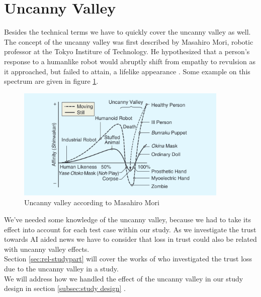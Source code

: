 \documentclass[
  a4paper,  %
  twoside,  %
  bibliography=totoc,
  headsepline,
  cleardoublepage=empty,
  parskip=half,
  draft=false
]{scrbook}
\begin{document}
\section{Uncanny Valley}
Besides the technical terms we have to quickly cover the uncanny valley as well. The concept of the uncanny valley was first described by Masahiro Mori, robotic professor at the Tokyo Institure of Technology. He hypothesized that a person's response to a humanlike robot would abruptly shift from empathy to revulsion as it approached, but failed to attain, a lifelike appearance \cite{moriUncannyValleyField2012}. Some example on this spectrum are given in figure \ref{fig:uncanny-valley}.
\begin{figure}[h]
  \centering
  \includegraphics[width=0.9\textwidth]{./graphics/images/uncanny-valley.png}
  \caption{Uncanny valley according to Masahiro Mori \cite{moriUncannyValleyField2012}}
  \label{fig:uncanny-valley}
\end{figure}
We've needed some knowledge of the uncanny valley, because we had to take its effect into account for each test case within our study. As we investigate the trust towards AI aided news we have to consider that loss in trust could also be related with uncanny valley effects. \\
Section \ref{sec:rel-studypart} will cover the works of \citeauthor{weismanFaceUncannyEffects2021} who investigated the trust loss due to the uncanny valley in a study. \\
We will address how we handled the effect of the uncanny valley in our study design in section \ref{subsec:study design}
.
\end{document}
